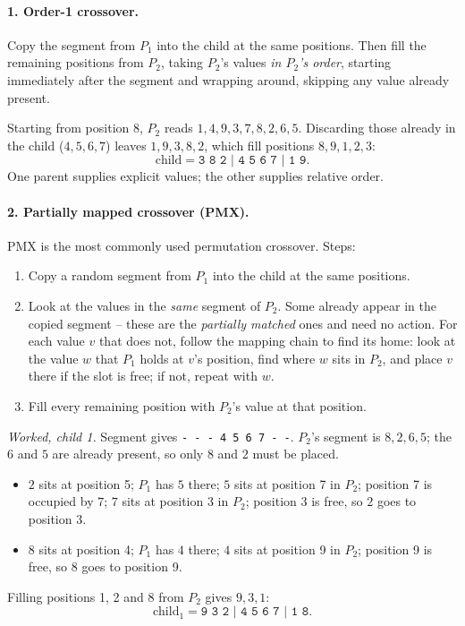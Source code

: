 \documentclass[11pt,a4paper]{article}
\begin{document}
\paragraph{1. Order-1 crossover.}
Copy the segment from $P_1$ into the child at the same positions. Then fill
the remaining positions from $P_2$, taking $P_2$'s values \emph{in $P_2$'s
order}, starting immediately after the segment and wrapping around, skipping
any value already present.

Starting from position 8, $P_2$ reads $1,4,9,3,7,8,2,6,5$. Discarding those
already in the child ($4,5,6,7$) leaves $1,9,3,8,2$, which fill positions
$8,9,1,2,3$:
\[
  \text{child}=\texttt{3\ 8\ 2\ | 4\ 5\ 6\ 7 |\ 1\ 9}.
\]
One parent supplies explicit values; the other supplies relative order.

\paragraph{2. Partially mapped crossover (PMX).}
PMX is the most commonly used permutation crossover. Steps:
\begin{enumerate}
\item Copy a random segment from $P_1$ into the child at the same positions.
\item Look at the values in the \emph{same} segment of $P_2$. Some already
      appear in the copied segment -- these are the \emph{partially matched}
      ones and need no action. For each value $v$ that does not, follow the
      mapping chain to find its home: look at the value $w$ that $P_1$ holds
      at $v$'s position, find where $w$ sits in $P_2$, and place $v$ there if
      the slot is free; if not, repeat with $w$.
\item Fill every remaining position with $P_2$'s value at that position.
\end{enumerate}

\emph{Worked, child 1.} Segment gives \texttt{-\ -\ -\ 4\ 5\ 6\ 7\ -\ -}.
$P_2$'s segment is $8,2,6,5$; the $6$ and $5$ are already present, so only
$8$ and $2$ must be placed.
\begin{itemize}
\item $2$ sits at position 5; $P_1$ has $5$ there; $5$ sits at position 7 in
      $P_2$; position 7 is occupied by $7$; $7$ sits at position 3 in $P_2$;
      position 3 is free, so $2$ goes to position 3.
\item $8$ sits at position 4; $P_1$ has $4$ there; $4$ sits at position 9 in
      $P_2$; position 9 is free, so $8$ goes to position 9.
\end{itemize}
Filling positions 1, 2 and 8 from $P_2$ gives $9,3,1$:
\[
  \text{child}_1=\texttt{9\ 3\ 2\ | 4\ 5\ 6\ 7 |\ 1\ 8}.
\]
\end{document}
